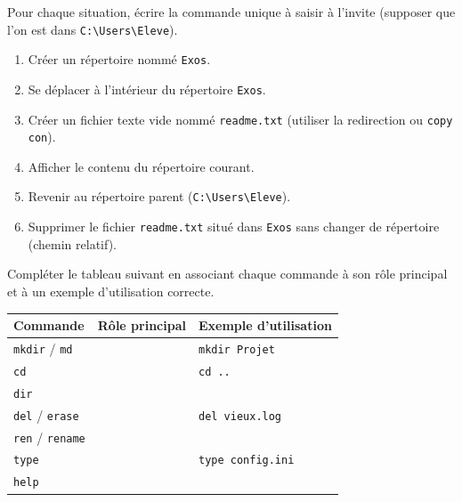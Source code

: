 \documentclass[11pt]{article}
\begin{document}
\begin{exercice}
Pour chaque situation, écrire la commande unique à saisir à l'invite (supposer que l'on est dans \texttt{C:\textbackslash Users\textbackslash Eleve}).
\begin{enumerate}
    \item Créer un répertoire nommé \texttt{Exos}.
    \item Se déplacer à l'intérieur du répertoire \texttt{Exos}.
    \item Créer un fichier texte vide nommé \texttt{readme.txt} (utiliser la redirection ou \texttt{copy con}).
    \item Afficher le contenu du répertoire courant.
    \item Revenir au répertoire parent (\texttt{C:\textbackslash Users\textbackslash Eleve}).
    \item Supprimer le fichier \texttt{readme.txt} situé dans \texttt{Exos} sans changer de répertoire (chemin relatif).
\end{enumerate}
\end{exercice}

\begin{exercice}
Compléter le tableau suivant en associant chaque commande à son rôle principal et à un exemple d'utilisation correcte.

\begin{tabular}{|l|p{5cm}|p{5cm}|}
\hline
\textbf{Commande} & \textbf{Rôle principal} & \textbf{Exemple d'utilisation} \\
\hline
\texttt{mkdir} / \texttt{md} & & \texttt{mkdir Projet} \\
\hline
\texttt{cd} & & \texttt{cd ..} \\
\hline
\texttt{dir} & & \\
\hline
\texttt{del} / \texttt{erase} & & \texttt{del vieux.log} \\
\hline
\texttt{ren} / \texttt{rename} & & \\
\hline
\texttt{type} & & \texttt{type config.ini} \\
\hline
\texttt{help} & & \\
\hline
\end{tabular}
\end{exercice}
\end{document}
